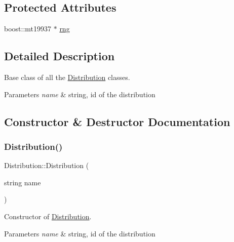 \subsection*{Protected Attributes}
\begin{DoxyCompactItemize}
\item 
boost\+::mt19937 $\ast$ \mbox{\hyperlink{class_distribution_ac8915a45ce85ab6b7506fa42bb850a89}{rng}}
\end{DoxyCompactItemize}


\subsection{Detailed Description}
Base class of all the \mbox{\hyperlink{class_distribution}{Distribution}} classes. 


\begin{DoxyParams}{Parameters}
{\em name} & string, id of the distribution \\
\hline
\end{DoxyParams}


\subsection{Constructor \& Destructor Documentation}
\mbox{\label{class_distribution_a7734801d8703a4d0f43a83d7439e5ca6}} 
\subsubsection{\texorpdfstring{Distribution()}{Distribution()}\hspace{0.1cm}{\footnotesize\ttfamily [1/2]}}
{\footnotesize\ttfamily Distribution\+::\+Distribution (\begin{DoxyParamCaption}\item[{string}]{name }\end{DoxyParamCaption})}



Constructor of \mbox{\hyperlink{class_distribution}{Distribution}}. 


\begin{DoxyParams}{Parameters}
{\em name} & string, id of the distribution \\
\hline
\end{DoxyParams}
\mbox{\label{class_distribution_a405bc928b7710b5362c7070489a7362e}} 
